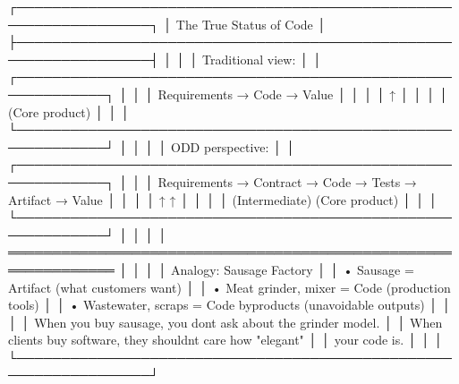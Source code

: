 \documentclass[
]{article}
\newenvironment{Shaded}{}{}
\newcommand{\NormalTok}[1]{#1}
\begin{document}
\begin{Shaded}
\begin{Highlighting}[]
\NormalTok{┌─────────────────────────────────────────────────────────────────┐}
\NormalTok{│                    The True Status of Code                       │}
\NormalTok{├─────────────────────────────────────────────────────────────────┤}
\NormalTok{│                                                                  │}
\NormalTok{│  Traditional view:                                              │}
\NormalTok{│  ┌────────────────────────────────────────────────────────────┐ │}
\NormalTok{│  │  Requirements → Code → Value                               │ │}
\NormalTok{│  │                  ↑                                         │ │}
\NormalTok{│  │              (Core product)                                │ │}
\NormalTok{│  └────────────────────────────────────────────────────────────┘ │}
\NormalTok{│                                                                  │}
\NormalTok{│  ODD perspective:                                               │}
\NormalTok{│  ┌────────────────────────────────────────────────────────────┐ │}
\NormalTok{│  │  Requirements → Contract → Code → Tests → Artifact → Value │ │}
\NormalTok{│  │                             ↑              ↑               │ │}
\NormalTok{│  │                      (Intermediate)    (Core product)      │ │}
\NormalTok{│  └────────────────────────────────────────────────────────────┘ │}
\NormalTok{│                                                                  │}
\NormalTok{│  ══════════════════════════════════════════════════════════════  │}
\NormalTok{│                                                                  │}
\NormalTok{│  Analogy: Sausage Factory                                       │}
\NormalTok{│  • Sausage = Artifact (what customers want)                     │}
\NormalTok{│  • Meat grinder, mixer = Code (production tools)                │}
\NormalTok{│  • Wastewater, scraps = Code byproducts (unavoidable outputs)   │}
\NormalTok{│                                                                  │}
\NormalTok{│  When you buy sausage, you don\textquotesingle{}t ask about the grinder model.   │}
\NormalTok{│  When clients buy software, they shouldn\textquotesingle{}t care how "elegant"   │}
\NormalTok{│  your code is.                                                  │}
\NormalTok{│                                                                  │}
\NormalTok{└─────────────────────────────────────────────────────────────────┘}
\end{Highlighting}
\end{Shaded}
\end{document}
